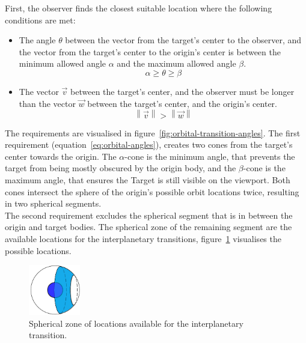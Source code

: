 First, the observer finds the closest suitable location where the following conditions are met:
\begin{itemize}
    \item The angle $\theta$ between the vector from the target's center to the observer, and the vector from the
    target's center to the origin's center is between the minimum allowed angle $\alpha$ and the maximum allowed
    angle $\beta$.
    \begin{equation}
        \label{eq:orbital-angles}
        \alpha \geq \theta \geq \beta
    \end{equation}

    \item The vector $\vec{v}$ between the target's center, and the observer must be longer than the vector $\vec{w}$
    between the target's center, and the origin's center.
    \begin{equation}
        \label{eq:orbital-magnitudes}
        \left\| \vec{v} \right\| > \left\| \vec{w} \right\|
    \end{equation}
\end{itemize}
The requirements are visualised in figure~\ref{fig:orbital-transition-angles}.
The first requirement (equation~\ref{eq:orbital-angles}), creates two cones from the target's center towards the origin.
The $\alpha$-cone is the minimum angle, that prevents the target from being mostly obscured by the origin body, and
the $\beta$-cone is the maximum angle, that ensures the Target is still visible on the viewport.
Both cones intersect the sphere of the origin's possible orbit locations twice, resulting in two spherical segments.
\\
The second requirement excludes the spherical segment that is in between the origin and target bodies.
The spherical zone of the remaining segment are the available locations for the interplanetary transitions,
figure~\ref{fig:orbital-transition-zone} visualises the possible locations.

\begin{figure}
    \centering
    \includegraphics[width=0.2\textwidth]{content/4_3_autoNavigation/img/OrbitTransitionSphericalZone}
    \caption{Spherical zone of locations available for the interplanetary transition.}
    \label{fig:orbital-transition-zone}
\end{figure}

